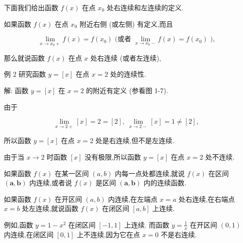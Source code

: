 \documentclass[lang=cn,newtx,10pt,scheme=chinese]{elegantbook}
\begin{document}
\begin{definition}[单侧连续性] 

下面我们给出函数 \(f\left( x\right)\) 在点 \({x}_{0}\) 处右连续和左连续的定义.

如果函数 \(f\left( x\right)\) 在点 \({x}_{0}\) 附近右侧 (或左侧) 有定义,而且

\[
\mathop{\lim }\limits_{{x \rightarrow {x}_{0} + }}f\left( x\right) = f\left( {x}_{0}\right) \text{ (或者 }\mathop{\lim }\limits_{{x \rightarrow {x}_{0} - }}f\left( x\right) = f\left( {x}_{0}\right) \text{ ),}
\]

那么就说函数 \(f\left( x\right)\) 在点 \(x\) 处右连续 (或者左连续),

\end{definition}

例 2 研究函数 \(y = \left\lbrack x\right\rbrack\) 在点 \(x = 2\) 处的连续性.

解: 函数 \(y = \left\lbrack x\right\rbrack\) 在 \(x = 2\) 的附近有定义 (参看图 1-7).

由于

\[
\mathop{\lim }\limits_{{x \rightarrow 2 + }}\left\lbrack x\right\rbrack = 2 = \left\lbrack 2\right\rbrack ,\;\mathop{\lim }\limits_{{x \rightarrow 2 - }}\left\lbrack x\right\rbrack = 1 \neq \left\lbrack 2\right\rbrack ,
\]

所以函数 \(y = \left\lbrack x\right\rbrack\) 在点 \(x = 2\) 处是右连续,但不是左连续.

由于当 \(x \rightarrow 2\) 时函数 \(\left\lbrack x\right\rbrack\) 没有极限,所以函数 \(y = \left\lbrack x\right\rbrack\) 在点 \(x = 2\) 处不连续.

\begin{definition}[区间连续性] 

如果函数 \(f\left( x\right)\) 在某一区间 \(\left( {a,b}\right)\) 内每一点处都连续,就说 \(f\left( x\right)\) 在区间 \(\left( {\mathbf{a},\mathbf{b}}\right)\) 内连续,或者说 \(f\left( x\right)\) 是区间 \(\left( {\mathbf{a},\mathbf{b}}\right)\) 内的连续函数.

如果函数 \(f\left( x\right)\) 在开区间 \(\left( {a,b}\right)\) 内连续,在左端点 \(x = a\) 处右连续,在右端点 \(x = b\) 处左连续,就说函数 \(f\left( x\right)\) 在闭区间 \(\left\lbrack {a,b}\right\rbrack\) 上连续.

\end{definition}

例如,函数 \(y = 1 - {x}^{2}\) 在闭区间 \(\left\lbrack {-1,1}\right\rbrack\) 上连续. 而函数 \(y = \frac{1}{x}\) 在开区间 \(\left( {0,1}\right)\) 内连续,在闭区间 \(\left\lbrack {0,1}\right\rbrack\) 上不连续,因为它在点 \(x = 0\) 不是右连续.
\end{document}
